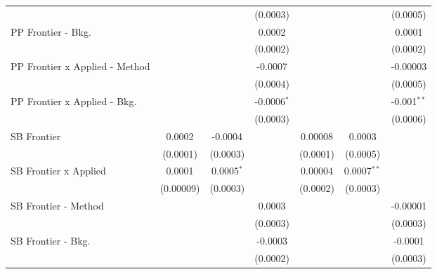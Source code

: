 \begin{tabular}{lcccccc}
                                  &                 &                 & (0.0003)        &                 &                & (0.0005)\\   
   PP Frontier - Bkg.             &                 &                 & 0.0002          &                 &                & 0.0001\\   
                                  &                 &                 & (0.0002)        &                 &                & (0.0002)\\   
   PP Frontier x Applied - Method &                 &                 & -0.0007         &                 &                & -0.00003\\   
                                  &                 &                 & (0.0004)        &                 &                & (0.0005)\\   
   PP Frontier x Applied - Bkg.   &                 &                 & -0.0006$^{*}$   &                 &                & -0.001$^{**}$\\   
                                  &                 &                 & (0.0003)        &                 &                & (0.0006)\\   
   SB Frontier                    & 0.0002          & -0.0004         &                 & 0.00008         & 0.0003         &   \\   
                                  & (0.0001)        & (0.0003)        &                 & (0.0001)        & (0.0005)       &   \\   
   SB Frontier x Applied          & 0.0001          & 0.0005$^{*}$    &                 & 0.00004         & 0.0007$^{**}$  &   \\   
                                  & (0.00009)       & (0.0003)        &                 & (0.0002)        & (0.0003)       &   \\   
   SB Frontier - Method           &                 &                 & 0.0003          &                 &                & -0.00001\\   
                                  &                 &                 & (0.0003)        &                 &                & (0.0003)\\   
   SB Frontier - Bkg.             &                 &                 & -0.0003         &                 &                & -0.0001\\   
                                  &                 &                 & (0.0002)        &                 &                & (0.0003)\\   

\end{tabular}
